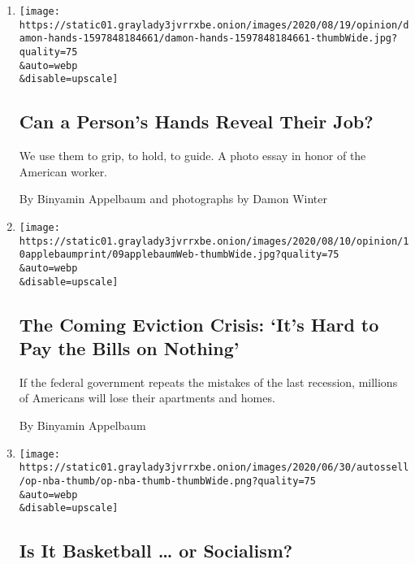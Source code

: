 \begin{enumerate}
\def\labelenumi{\arabic{enumi}.}
\item
  \href{/interactive/2020/09/06/opinion/inequality-worker-hand-photos.html}{}

  \texttt{[image: https://static01.graylady3jvrrxbe.onion/images/2020/08/19/opinion/damon-hands-1597848184661/damon-hands-1597848184661-thumbWide.jpg?quality=75\\\&auto=webp\\\&disable=upscale]}

  \hypertarget{can-a-persons-hands-reveal-their-job}{%
  \subsection{Can a Person's Hands Reveal Their
  Job?}\label{can-a-persons-hands-reveal-their-job}}

  We use them to grip, to hold, to guide. A photo essay in honor of the
  American worker.

  By Binyamin Appelbaum and photographs by Damon Winter
\item
  \href{/2020/08/09/opinion/evictions-foreclosures-covid-economy.html}{}

  \texttt{[image: https://static01.graylady3jvrrxbe.onion/images/2020/08/10/opinion/10applebaumprint/09applebaumWeb-thumbWide.jpg?quality=75\\\&auto=webp\\\&disable=upscale]}

  \hypertarget{the-coming-eviction-crisis-its-hard-to-pay-the-bills-on-nothing}{%
  \subsection{The Coming Eviction Crisis: `It's Hard to Pay the Bills on
  Nothing'}\label{the-coming-eviction-crisis-its-hard-to-pay-the-bills-on-nothing}}

  If the federal government repeats the mistakes of the last recession,
  millions of Americans will lose their apartments and homes.

  By Binyamin Appelbaum
\item
  \href{/2020/06/29/opinion/income-inequality-nba-socialism.html}{}

  \texttt{[image: https://static01.graylady3jvrrxbe.onion/images/2020/06/30/autossell/op-nba-thumb/op-nba-thumb-thumbWide.png?quality=75\\\&auto=webp\\\&disable=upscale]}

  \hypertarget{is-it-basketball--or-socialism}{%
  \subsection{Is It Basketball \ldots{} or
  Socialism?}\label{is-it-basketball--or-socialism}}


\end{enumerate}
